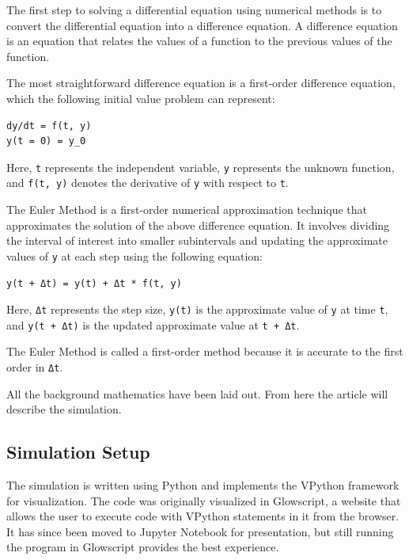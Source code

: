 \documentclass[11pt]{article}
\begin{document}
The first step to solving a differential equation using numerical
methods is to convert the differential equation into a difference
equation. A difference equation is an equation that relates the values
of a function to the previous values of the function.

The most straightforward difference equation is a first-order difference
equation, which the following initial value problem can represent:

\begin{verbatim}
dy/dt = f(t, y)
y(t = 0) = y_0
\end{verbatim}

Here, \texttt{t} represents the independent variable, \texttt{y}
represents the unknown function, and \texttt{f(t,\ y)} denotes the
derivative of \texttt{y} with respect to \texttt{t}.

The Euler Method is a first-order numerical approximation technique that
approximates the solution of the above difference equation. It involves
dividing the interval of interest into smaller subintervals and updating
the approximate values of \texttt{y} at each step using the following
equation:

\begin{verbatim}
y(t + Δt) = y(t) + Δt * f(t, y)
\end{verbatim}

Here, \texttt{Δt} represents the step size, \texttt{y(t)} is the
approximate value of \texttt{y} at time \texttt{t}, and
\texttt{y(t\ +\ Δt)} is the updated approximate value at
\texttt{t\ +\ Δt}.

The Euler Method is called a first-order method because it is accurate
to the first order in \texttt{Δt}.

    All the background mathematics have been laid out. From here the article
will describe the simulation.

    \hypertarget{simulation-setup}{%
\subsection{Simulation Setup}\label{simulation-setup}}

The simulation is written using Python and implements the VPython
framework for visualization. The code was originally visualized in
Glowscript, a website that allows the user to execute code with VPython
statements in it from the browser. It has since been moved to Jupyter
Notebook for presentation, but still running the program in Glowscript
provides the best experience.
\end{document}
